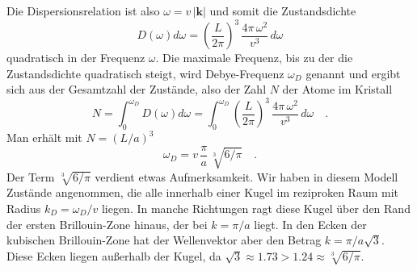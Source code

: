 Die Dispersionsrelation ist also $\omega = v \, | \mathbf{k} |$ und somit die Zustandsdichte
\begin{equation}
D(\omega) d\omega = \left( \frac{L}{2 \pi} \right)^3 \,     \frac{ 4 \pi \, \omega^2 }{v^3}   \, d\omega \label{eq:wk_debye_dos}
\end{equation} 
quadratisch in der Frequenz $\omega$. Die maximale Frequenz, bis zu der die Zustandsdichte quadratisch steigt, wird Debye-Frequenz $\omega_D$ genannt und ergibt sich aus der Gesamtzahl der Zustände, also der Zahl $N$ der Atome im Kristall
\begin{equation}
N =  \int_0^{\omega_{D}} D(\omega) d\omega
= \int_0^{\omega_{D}}  \left( \frac{L}{2 \pi} \right)^3 \,     \frac{ 4 \pi \, \omega^2 }{v^3}   \, d\omega  \quad .
\end{equation}
Man erhält mit $N = (L / a)^3$
\begin{equation}
\omega_{D} = v \, \frac{\pi}{a} \, \sqrt[3]{6 / \pi} \quad .
\end{equation}
Der Term $\sqrt[3]{6 / \pi}$ verdient etwas Aufmerksamkeit. Wir haben in diesem Modell Zustände angenommen, die alle innerhalb einer Kugel im reziproken Raum mit Radius $k_{D} = \omega_{D} / v$ liegen. In manche Richtungen ragt diese Kugel über den Rand der ersten Brillouin-Zone hinaus, der bei $k = \pi / a$ liegt. In den  Ecken der kubischen Brillouin-Zone hat der Wellenvektor  aber den Betrag $k = \pi / a \sqrt{3}$. Diese Ecken liegen außerhalb der Kugel, da $\sqrt{3} \approx 1.73 > 1.24 \approx \sqrt[3]{6 / \pi}$.



